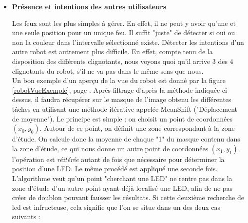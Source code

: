 \begin{itemize}
				\item \textbf{Présence et intentions des autres utilisateurs}

					Les feux sont les plus simples à gérer. En effet, il ne peut y avoir qu'une et une seule position pour un unique feu. Il suffit "juste" de détecter si oui ou non la couleur dans l'intervalle sélectionné existe. Détecter les intentions d'un autre robot est autrement plus difficile. En effet, compte tenu de la disposition des différents clignotants, nous voyons quoi qu'il arrive 3 des 4 clignotants du robot, s'il ne va pas dans le même sens que nous. \\
					Un bon exemple d'un aperçu de la vue du robot est donné par la figure \ref{robotVueExemple}, page \pageref{robotVueExemple}.
					Après filtrage d'après la méthode indiquée ci-dessus, il faudra récupérer sur le masque de l'image obtenu les différentes tâches en utilisant une méthode itérative appelée MeanShift ("Déplacement de moyenne"). Le principe est simple : on choisit un point de coordonnées $(x_0,y_0)$. Autour de ce point, on définit une zone correspondant à la zone d'étude. On calcule donc la moyenne de chaque "1" du masque contenu dans la zone d'étude, ce qui nous donne un autre point de coordonnées $(x_1,y_1)$. l'opération est \textit{réitérée} autant de fois que nécessaire pour déterminer la position d'une LED. Le même procédé est appliqué une seconde fois. L'algorithme veut qu'un point "cherchant une LED" ne rentre pas dans la zone d'étude d'un autre point ayant déjà localisé une LED, afin de ne pas créer de doublon pouvant fausser les résultats. Si cette deuxième recherche de led est infructeuse, cela signifie que l'on se situe dans un des deux cas suivants :


\end{itemize}
